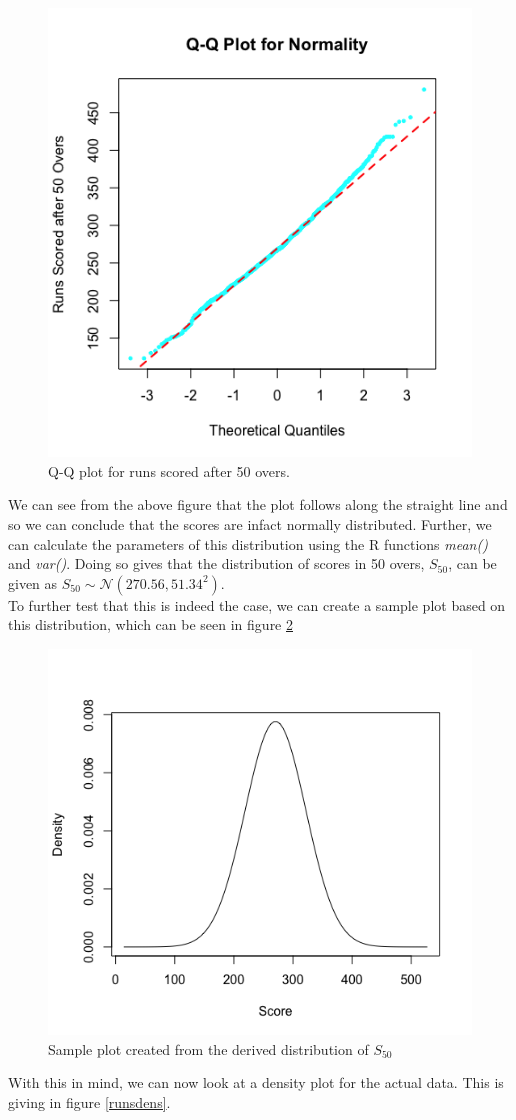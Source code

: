 \begin{figure}[h]
    \label{qqplot}
    \centering
    \includegraphics[width=0.4\linewidth]{figures/qqnormplot.png}
    \caption{Q-Q plot for runs scored after 50 overs.}
\end{figure}

We can see from the above figure that the plot follows along the straight line and so we can conclude that the scores are infact normally distributed. 
Further, we can calculate the parameters of this distribution using the R functions \textit{mean()} and \textit{var()}. Doing so gives that the distribution
of scores in 50 overs, $S_{50}$, can be given as $S_{50} \sim \mathcal{N}(270.56,51.34^2)$. \\ 

To further test that this is indeed the case, we can create a sample plot based on this distribution, which can be seen in figure \ref{samplenorm}

\begin{figure}[h]
    \label{samplenorm}
    \centering
    \includegraphics[width=0.4\linewidth]{figures/samplenorm.png}
    \caption{Sample plot created from the derived distribution of $S_{50}$}
\end{figure}

With this in mind, we can now look at a density plot for the actual data. This is giving in figure \ref{runsdens}.

